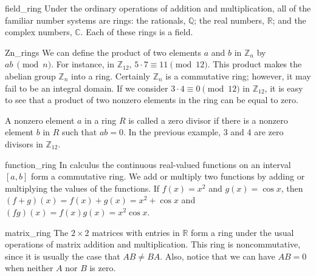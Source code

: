  
\begin{example}{field_ring}
Under the ordinary operations of addition and multiplication, all of
the familiar number systems are rings: the rationals, ${\mathbb Q}$; the
real numbers, ${\mathbb R}$; and the complex numbers, ${\mathbb C}$. Each of
these rings is a field. 
\end{example}
 
 
\begin{example}{Zn_rings}
We can define the product of two elements $a$ and $b$ in ${\mathbb Z}_n$
by $ab~\pmod{n}$. For instance, in ${\mathbb Z}_{12}$,  $5 \cdot 7 \equiv
11 \pmod{12}$.  This product makes the abelian group ${\mathbb Z}_n$ into
a ring. Certainly ${\mathbb Z}_n$ is a commutative ring; however, it may
fail to be an integral domain.  If we consider $3 \cdot 4 \equiv 0
\pmod{12}$ in ${\mathbb Z}_{12}$, it is easy to see that a product of two 
nonzero elements in the ring can be equal to zero.  
\end{example}

 
 
A nonzero element $a$ in a ring $R$ is called a {\bfi zero
divisor\/} if there is a nonzero element $b$ in $R$
such that $ab = 0$. In the previous example,  3 and 4 are zero
divisors in ${\mathbb Z}_{12}$.  
 
 
\begin{example}{function_ring}
In calculus the continuous real-valued functions on an interval
$[a,b]$ form a commutative ring. We add or multiply two functions by 
adding or multiplying the values of the functions.  If $f(x) = x^2$ and
$g(x) = \cos x$, then $(f+g)(x) = f(x) + g(x) = x^2 + \cos x$ and
$(fg)(x) = f(x) g(x) = x^2 \cos x$.
\mbox{\hspace{1in}}
\end{example}
 
 
\begin{example}{matrix_ring}
The $2 \times 2$ matrices  with entries in ${\mathbb R}$ form a ring
under the usual operations of matrix addition and multiplication. This
ring is \mbox{noncommutative}, since it is usually the case that $AB \neq
BA$. Also, notice that we can have $AB = 0$ when neither $A$ nor $B$
is zero. 
\end{example}
 
